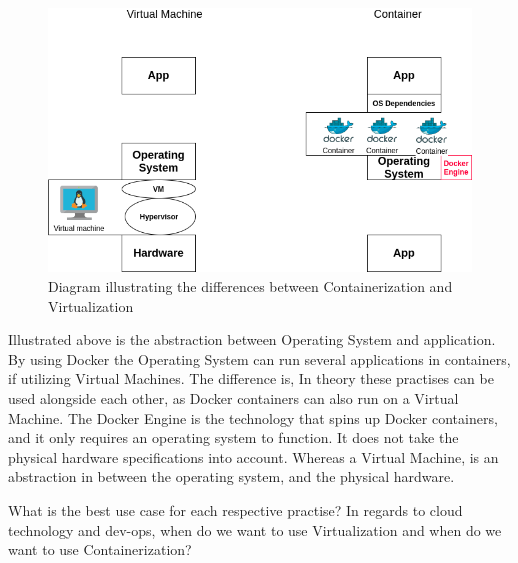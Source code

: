 \documentclass[a4paper,10pt]{article}
\begin{document}
	\begin{figure}[H]
		\centering
		\label{marker}
		\includegraphics[width=\textwidth]{vm_container}
		\caption{Diagram illustrating the differences between Containerization and Virtualization}
	\end{figure}
	Illustrated above is the abstraction between Operating System and application. 
	By using Docker the Operating System can run several applications in containers, if utilizing Virtual Machines. The difference is, In theory these practises can be used alongside each other, as Docker containers can also run on a Virtual Machine. The Docker Engine is the technology that spins up Docker containers, and it only requires an operating system to function. It does not take the physical hardware specifications into account. Whereas a Virtual Machine, is an abstraction in between the operating system, and the physical hardware. 
	
	What is the best use case for each respective practise? 
	In regards to cloud technology and dev-ops, when do we want to use Virtualization and when do we want to use Containerization? 
	
\end{document}
